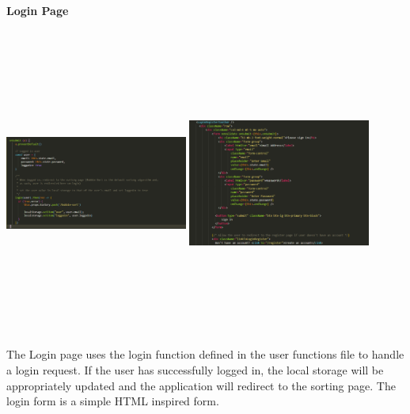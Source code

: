 \bigskip
\paragraph{Login Page}
\begin{center}
    \includegraphics[width=6cm,height=10cm,keepaspectratio]{images/login2}
    \includegraphics[width=6cm,height=10cm,keepaspectratio]{images/login1}
\end{center}
The Login page uses the login function defined in the user functions file to handle a login request. If the user has successfully logged in, the local storage will be appropriately updated and the application will redirect to the sorting page. The login form is a simple HTML inspired form.

